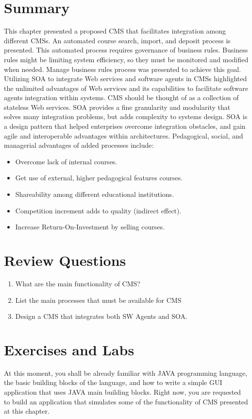 \documentclass[12pt,a4paper,final,twoside,onecolumn,titlepage]{book}
\begin{document}
\section{Summary}
This chapter presented a proposed \gls{CMS} that facilitates integration among different \gls{CMS}s. An automated course search, import, and deposit process is presented. This automated process requires governance of business rules. Business rules might be limiting system efficiency, so they must be monitored and modified when needed. Manage business rules process was presented to achieve this goal. Utilizing \gls{SOA} to integrate Web services and software agents in \gls{CMS}s highlighted the unlimited advantages of Web services and its capabilities to facilitate software agents integration within systems. \gls{CMS} should be thought of as a collection of stateless Web services. \gls{SOA} provides a fine granularity and modularity that solves many integration problems, but adds complexity to systems design. \gls{SOA} is a design pattern that helped enterprises overcome integration obstacles, and gain agile and interoperable advantages within architectures. Pedagogical, social, and managerial advantages of added processes include:
\begin{itemize}
\item Overcome lack of internal courses.
\item Get use of external, higher pedagogical features courses.
\item Shareability among different educational institutions.
\item Competition increment adds to quality (indirect effect).
\item Increase Return-On-Investment by selling courses. 
\end{itemize}

\section{Review Questions}
\begin{enumerate}
\item What are the main functionality of \gls{CMS}?
\item List the main processes that must be available for \gls{CMS}
\item Design a \gls{CMS} that integrates both \gls{SW} Agents and \gls{SOA}.
\end{enumerate}

\section{Exercises and Labs}
At this moment, you shall be already familiar with JAVA programming language, the basic building blocks of the language, and how to write a simple GUI application that uses JAVA main building blocks. Right now, you are requested to build an application that simulates some of the functionality of \gls{CMS} presented at this chapter.
\end{document}
